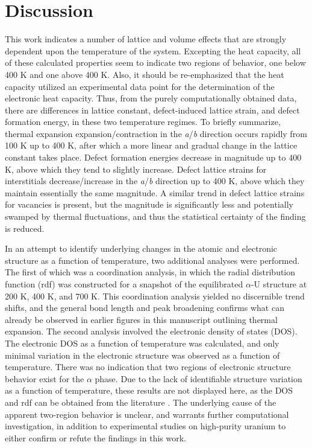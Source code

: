 \documentclass[review]{elsarticle}
\begin{document}
\FloatBarrier

\section{Discussion}

This work indicates a number of lattice and volume effects that are strongly dependent upon the temperature of the system. Excepting the heat capacity, all of these calculated properties seem to indicate two regions of behavior, one below 400 K and one above 400 K. Also, it should be re-emphasized that the heat capacity utilized an experimental data point for the determination of the electronic heat capacity. Thus, from the purely computationally obtained data, there are differences in lattice constant, defect-induced lattice strain, and defect formation energy, in these two temperature regimes. To briefly summarize, thermal expansion expansion/contraction in the \textit{a}/\textit{b} direction occurs rapidly from 100 K up to 400 K, after which a more linear and gradual change in the lattice constant takes place. Defect formation energies decrease in magnitude up to 400 K, above which they tend to slightly increase. Defect lattice strains for interstitials decrease/increase in the \textit{a}/\textit{b} direction up to 400 K, above which they maintain essentially the same magnitude. A similar trend in defect lattice strains for vacancies is present, but the magnitude is significantly less and potentially swamped by thermal fluctuations, and thus the statistical certainty of the finding is reduced. 

In an attempt to identify underlying changes in the atomic and electronic structure as a function of temperature, two additional analyses were performed. The first of which was a coordination analysis, in which the radial distribution function (rdf) was constructed for a snapshot of the equilibrated $\alpha$-U structure at 200 K, 400 K, and 700 K. This coordination analysis yielded no discernible trend shifts, and the general bond length and peak broadening confirms what can already be observed in earlier figures in this manuscript outlining thermal expansion. The second analysis involved the electronic density of states (DOS). The electronic DOS as a function of temperature was calculated, and only minimal variation in the electronic structure was observed as a function of temperature. There was no indication that two regions of electronic structure behavior exist for the $\alpha$ phase. Due to the lack of identifiable structure variation as a function of temperature, these results are not displayed here, as the DOS and rdf can be obtained from the literature \cite{beeler2013,hood2008}. The underlying cause of the apparent two-region behavior is unclear, and warrants further computational investigation, in addition to experimental studies on high-purity uranium to either confirm or refute the findings in this work.
\end{document}
